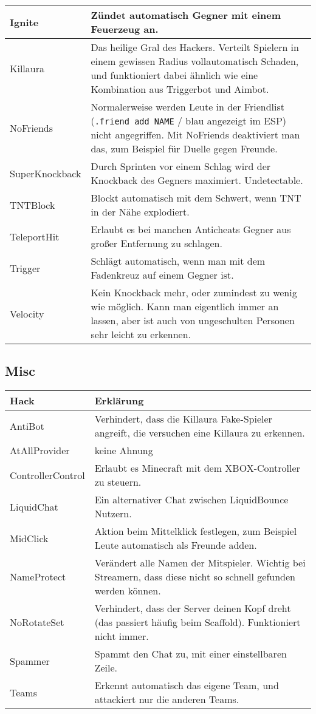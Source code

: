 \begin{longtable}{p{3cm}|p{10cm}}
\hline
Ignite & Zündet automatisch Gegner mit einem Feuerzeug an. \\
\hline
\rowcolor{lime!50} Killaura & Das heilige Gral des Hackers. Verteilt Spielern in einem gewissen Radius vollautomatisch Schaden, und funktioniert dabei ähnlich wie eine Kombination aus Triggerbot und Aimbot. \\
\hline
NoFriends & Normalerweise werden Leute in der Friendlist (\texttt{.friend add NAME} / blau angezeigt im ESP) nicht angegriffen. Mit NoFriends deaktiviert man das, zum Beispiel für Duelle gegen Freunde. \\
\hline
SuperKnockback & Durch Sprinten vor einem Schlag wird der Knockback des Gegners maximiert. Undetectable. \\
\hline
TNTBlock & Blockt automatisch mit dem Schwert, wenn TNT in der Nähe explodiert. \\
\hline
TeleportHit & Erlaubt es bei manchen Anticheats Gegner aus großer Entfernung zu schlagen. \\
\hline
Trigger & Schlägt automatisch, wenn man mit dem Fadenkreuz auf einem Gegner ist. \\
\hline
\rowcolor{lime!50} Velocity & Kein Knockback mehr, oder zumindest zu wenig wie möglich. Kann man eigentlich immer an lassen, aber ist auch von ungeschulten Personen sehr leicht zu erkennen. \\
\end{longtable}

\subsection{Misc}
\begin{longtable}{p{3cm}|p{10cm}}
\textbf{Hack} & \textbf{Erklärung} \\
\hline
\rowcolor{lime!50} AntiBot & Verhindert, dass die Killaura Fake-Spieler angreift, die versuchen eine Killaura zu erkennen. \\
\hline
AtAllProvider & keine Ahnung \\
\hline
ControllerControl & Erlaubt es Minecraft mit dem XBOX-Controller zu steuern. \\
\hline
LiquidChat & Ein alternativer Chat zwischen LiquidBounce Nutzern. \\
\hline
MidClick & Aktion beim Mittelklick festlegen, zum Beispiel Leute automatisch als Freunde adden. \\
\hline
NameProtect & Verändert alle Namen der Mitspieler. Wichtig bei Streamern, dass diese nicht so schnell gefunden werden können. \\
\hline
NoRotateSet & Verhindert, dass der Server deinen Kopf dreht (das passiert häufig beim Scaffold). Funktioniert nicht immer. \\
\hline
Spammer & Spammt den Chat zu, mit einer einstellbaren Zeile. \\
\hline
\rowcolor{lime!50} Teams & Erkennt automatisch das eigene Team, und attackiert nur die anderen Teams. \\
\end{longtable}